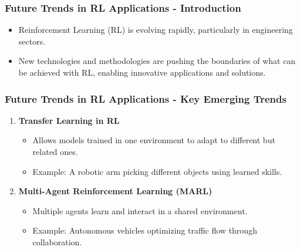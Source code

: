 \documentclass[aspectratio=169]{beamer}
\begin{document}
\begin{frame}[fragile]
  \frametitle{Future Trends in RL Applications - Introduction}
  \begin{itemize}
    \item Reinforcement Learning (RL) is evolving rapidly, particularly in engineering sectors.
    \item New technologies and methodologies are pushing the boundaries of what can be achieved with RL, enabling innovative applications and solutions.
  \end{itemize}
\end{frame}

\begin{frame}[fragile]
  \frametitle{Future Trends in RL Applications - Key Emerging Trends}
  \begin{enumerate}
    \item \textbf{Transfer Learning in RL}
      \begin{itemize}
        \item Allows models trained in one environment to adapt to different but related ones.
        \item Example: A robotic arm picking different objects using learned skills.
      \end{itemize}
    \item \textbf{Multi-Agent Reinforcement Learning (MARL)}
      \begin{itemize}
        \item Multiple agents learn and interact in a shared environment.
        \item Example: Autonomous vehicles optimizing traffic flow through collaboration.
      \end{itemize}
  \end{enumerate}
\end{frame}
\end{document}
